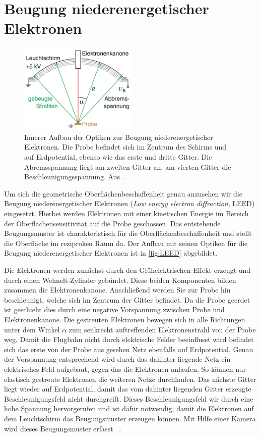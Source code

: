     \section{Beugung niederenergetischer Elektronen} \label{sec:LEED}
        \begin{figure}
            \centering
            \includegraphics[width=0.5\textwidth]{LEED}
            \caption{Innerer Aufbau der Optiken zur Beugung niederenergetischer Elektronen.
            Die Probe befindet sich im Zentrum des Schirms und auf Erdpotential, ebenso wie das erste und dritte Gitter.
            Die Abremsspannung liegt am zweiten Gitter an, am vierten Gitter die Beschleunigungsspannung.
            Aus~\cite{Fauster}.}
            \label{fig:LEED}
        \end{figure}
        Um sich die geometrische Oberflächenbeschaffenheit genau anzusehen wir die Beugung niederenergetischer Elektronen (\textit{Low energy electron diffraction}, LEED) eingesetzt.
        Hierbei werden Elektronen mit einer kinetischen Energie im Bereich der Oberflächensensitivität auf die Probe geschossen.
        Das entstehende Beugungsmuster ist charakteristisch für die Oberflächenbeschaffenheit und stellt die Oberfläche im reziproken Raum da.
        Der Aufbau mit seinen Optiken für die Beugung niederenergetischer Elektronen ist in \autoref{fig:LEED} abgebildet.
        
        Die Elektronen werden zunächst durch den Glühelektrischen Effekt erzeugt und durch einen Wehnelt-Zylinder gebündet.
        Diese beiden Komponenten bilden zusammen die Elektronenkanone.
        Anschließend werden Sie zur Probe hin beschleunigt, welche sich im Zentrum der Gitter befindet.
        Da die Probe geerdet ist geschieht dies durch eine negative Vorspannung zwischen Probe und Elektronenkanone.
        Die gestreuten Elektronen bewegen sich in alle Richtungen unter dem Winkel $\alpha$ zum senkrecht auftreffenden Elektronenstrahl von der Probe weg.
        Damit die Flugbahn nicht durch elektrische Felder beeinflusst wird befindet sich das erste von der Probe aus gesehen Netz ebenfalls auf Erdpotential.
        Genau der Vorspannung entsprechend wird durch das dahinter liegende Netz  ein elektrisches Feld aufgebaut, gegen das die Elektronen anlaufen.
        So können nur elastisch gestreute Elektronen die weiteren Netze durchlaufen.
        Das nächste Gitter liegt wieder auf Erdpotential, damit das vom dahinter liegenden Gitter erzeugte Beschleunigungsfeld nicht durchgreift.
        Dieses Beschleunigungsfeld wir durch eine hohe Spannung hervorgerufen und ist dafür notwendig, damit die Elektronen auf dem Leuchtschirm das Beugungsmuster erzeugen können.
        Mit Hilfe einer Kamera wird dieses Beugungsmuster erfasst ~\cite{Fauster}.

